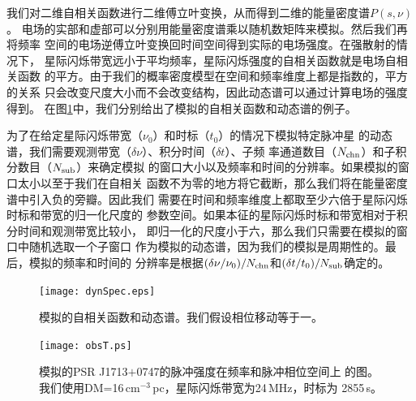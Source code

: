 我们对二维自相关函数进行二维傅立叶变换，从而得到二维的能量密度谱$P(s,\nu)$。
电场的实部和虚部可以分别用能量密度谱乘以随机数矩阵来模拟。然后我们再将频率
空间的电场逆傅立叶变换回时间空间得到实际的电场强度。在强散射的情况下，
星际闪烁带宽远小于平均频率，星际闪烁强度的自相关函数就是电场自相关函数
的平方。由于我们的概率密度模型在空间和频率维度上都是指数的，平方的关系
只会改变尺度大小而不会改变结构，因此动态谱可以通过计算电场的强度得到。
在图\ref{acffig}中，我们分别给出了模拟的自相关函数和动态谱的例子。

为了在给定星际闪烁带宽（$\nu_0$）和时标（$t_0$）的情况下模拟特定脉冲星
的动态谱，我们需要观测带宽（$\delta\nu$）、积分时间（$\delta t$）、子频
率通道数目（$N_{\rm{chn}}$）和子积分数目（$N_{\rm{sub}}$）来确定模拟
的窗口大小以及频率和时间的分辨率。如果模拟的窗口太小以至于我们在自相关
函数不为零的地方将它截断，那么我们将在能量密度谱中引入负的旁瓣。因此我们
需要在时间和频率维度上都取至少六倍于星际闪烁时标和带宽的归一化尺度的
参数空间。如果本征的星际闪烁时标和带宽相对于积分时间和观测带宽比较小，
即归一化的尺度小于六，那么我们只需要在模拟的窗口中随机选取一个子窗口
作为模拟的动态谱，因为我们的模拟是周期性的。最后，模拟的频率和时间的
分辨率是根据$(\delta\nu/\nu_0)/N_{\rm{chn}}$和$(\delta t/t_0)/N_{\rm{sub}}$确定的。


\begin{figure}
\begin{center}
\texttt{[image: dynSpec.eps]}
\end{center}
\caption{模拟的自相关函数和动态谱。我们假设相位移动等于一。}
\label{acffig}
\end{figure}

\begin{figure}
\begin{center}
\texttt{[image: obsT.ps]}
\end{center}
\caption{模拟的PSR J1713$+$0747的脉冲强度在频率和脉冲相位空间上
的图。我们使用DM=16\,cm$^{-3}$\,pc，星际闪烁带宽为24\,MHz，时标为
2855\,s。}
\label{obs1}
\end{figure}

